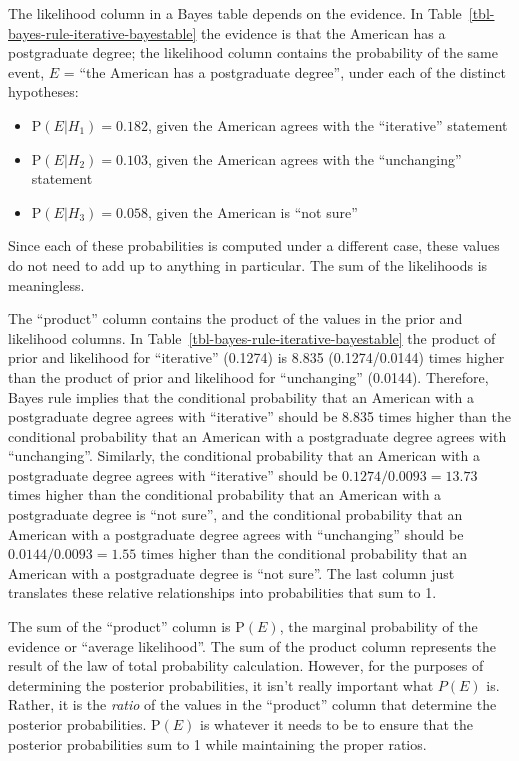 \documentclass[
  letterpaper,
  DIV=11,
  numbers=noendperiod]{scrreprt}
\providecommand{\tightlist}{%
  \setlength{\itemsep}{0pt}\setlength{\parskip}{0pt}}
\theoremstyle{plain}
\theoremstyle{definition}
\theoremstyle{definition}
\theoremstyle{definition}
\theoremstyle{remark}
\begin{document}
The likelihood column in a Bayes table depends on the evidence. In
Table~\ref{tbl-bayes-rule-iterative-bayestable} the evidence is that the
American has a postgraduate degree; the likelihood column contains the
probability of the same event, \(E\) = ``the American has a postgraduate
degree'', under each of the distinct hypotheses:

\begin{itemize}
\tightlist
\item
  \(\textrm{P}(E |H_1) = 0.182\), given the American agrees with the
  ``iterative'' statement
\item
  \(\textrm{P}(E |H_2) = 0.103\), given the American agrees with the
  ``unchanging'' statement
\item
  \(\textrm{P}(E |H_3) = 0.058\), given the American is ``not sure''
\end{itemize}

Since each of these probabilities is computed under a different case,
these values do not need to add up to anything in particular. The sum of
the likelihoods is meaningless.

The ``product'' column contains the product of the values in the prior
and likelihood columns. In
Table~\ref{tbl-bayes-rule-iterative-bayestable} the product of prior and
likelihood for ``iterative'' (0.1274) is 8.835 (0.1274/0.0144) times
higher than the product of prior and likelihood for ``unchanging''
(0.0144). Therefore, Bayes rule implies that the conditional probability
that an American with a postgraduate degree agrees with ``iterative''
should be 8.835 times higher than the conditional probability that an
American with a postgraduate degree agrees with ``unchanging''.
Similarly, the conditional probability that an American with a
postgraduate degree agrees with ``iterative'' should be
\(0.1274 / 0.0093 = 13.73\) times higher than the conditional
probability that an American with a postgraduate degree is ``not sure'',
and the conditional probability that an American with a postgraduate
degree agrees with ``unchanging'' should be \(0.0144 / 0.0093 = 1.55\)
times higher than the conditional probability that an American with a
postgraduate degree is ``not sure''. The last column just translates
these relative relationships into probabilities that sum to 1.

The sum of the ``product'' column is \(\textrm{P}(E)\), the marginal
probability of the evidence or ``average likelihood''. The sum of the
product column represents the result of the law of total probability
calculation. However, for the purposes of determining the posterior
probabilities, it isn't really important what \(P(E)\) is. Rather, it is
the \emph{ratio} of the values in the ``product'' column that determine
the posterior probabilities. \(\textrm{P}(E)\) is whatever it needs to
be to ensure that the posterior probabilities sum to 1 while maintaining
the proper ratios.
\end{document}
